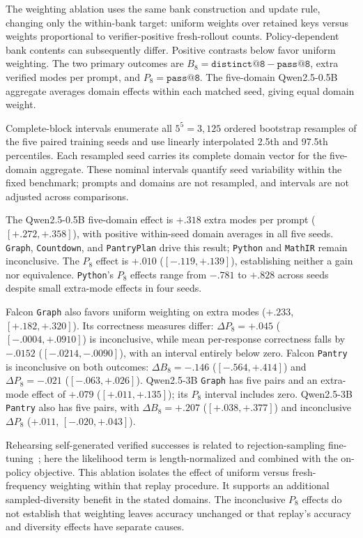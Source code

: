 \documentclass{article}
\newcommand{\1}{\mathbf 1}
\theoremstyle{remark}
\theoremstyle{definition}
\theoremstyle{plain}
\begin{document}
The weighting ablation uses the same bank construction and update rule,
changing only the within-bank target: uniform weights over retained keys
versus weights proportional to verifier-positive fresh-rollout counts.
Policy-dependent bank contents can subsequently differ. Positive contrasts
below favor uniform weighting. The two primary outcomes are
$B_8=\texttt{distinct@8}-\texttt{pass@8}$, extra verified modes per prompt,
and $P_8=\texttt{pass@8}$. The five-domain Qwen2.5-0.5B aggregate averages
domain effects within each matched seed, giving equal domain weight.

Complete-block intervals enumerate all $5^5=3{,}125$ ordered bootstrap
resamples of the five paired training seeds and use linearly interpolated
2.5th and 97.5th percentiles. Each resampled seed carries its complete domain
vector for the five-domain aggregate. These nominal intervals quantify seed
variability within the fixed benchmark; prompts and domains are not resampled,
and intervals are not adjusted across comparisons.

The Qwen2.5-0.5B five-domain effect is $+.318$ extra modes per
prompt ($[+.272,+.358]$), with positive within-seed domain averages in all
five seeds. \texttt{Graph}, \texttt{Countdown}, and \texttt{PantryPlan} drive this result; \texttt{Python} and
\texttt{MathIR} remain inconclusive. The $P_8$ effect is $+.010$
($[-.119,+.139]$), establishing neither a gain nor equivalence. \texttt{Python}'s
$P_8$ effects range from $-.781$ to $+.828$ across seeds despite
small extra-mode effects in four seeds.

Falcon \texttt{Graph} also favors uniform weighting on extra modes ($+.233$,
$[+.182,+.320]$). Its correctness measures differ: $\Delta P_8=+.045$
($[-.0004,+.0910]$) is inconclusive, while mean per-response correctness
falls by $-.0152$ ($[-.0214,-.0090]$), with an interval entirely below zero.
Falcon \texttt{Pantry} is inconclusive on both outcomes:
$\Delta B_8=-.146$ ($[-.564,+.414]$) and $\Delta P_8=-.021$
($[-.063,+.026]$). Qwen2.5-3B \texttt{Graph} has five pairs and an extra-mode effect of
$+.079$ ($[+.011,+.135]$); its $P_8$ interval includes zero.
Qwen2.5-3B \texttt{Pantry} also has five pairs, with $\Delta B_8=+.207$
($[+.038,+.377]$) and inconclusive $\Delta P_8$ ($+.011$, $[-.020,+.043]$).

Rehearsing self-generated verified successes is related to rejection-sampling
fine-tuning~\citep{dong2023raft}; here the likelihood term is length-normalized
and combined with the on-policy objective. This ablation isolates the effect
of uniform versus fresh-frequency weighting within that replay procedure.
It supports an additional sampled-diversity benefit in the stated domains.
The inconclusive $P_8$ effects do not establish that weighting leaves accuracy
unchanged or that replay's accuracy and diversity effects have separate causes.
\end{document}

